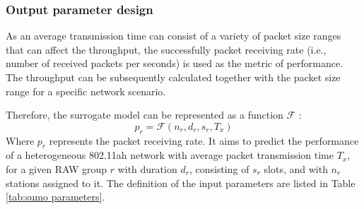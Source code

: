  \subsubsection{Output parameter design \label{subsec:output_para_design}}

 As an average transmission time can consist of a variety of packet size ranges that can affect the throughput, the successfully packet receiving rate (i.e., number of received packets per seconds) is used as the metric of performance. The throughput can be subsequently calculated
together with the packet size range for a specific network scenario.
 

 
 





Therefore, the surrogate model can be represented as a function  $\mathcal{F}$ :
\begin{equation} \label{eq:raw_model}
p_r = \mathcal{F}(n_r, d_r, s_r, T_x) 
\end{equation}
Where $p_r$ represents the packet receiving rate. It aims to predict the performance of a heterogeneous 802.11ah network with average packet transmission time $T_x$, for a given RAW group $r$ with duration $d_r$, consisting of $s_r$ slots, and with $n_r$ stations assigned to it. The definition of the input parameters are listed in Table \ref{tab:sumo parameters}.

